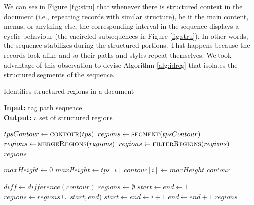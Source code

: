 We can see in Figure \ref{fig:stru} that whenever there is structured
content in the document (i.e., repeating records with similar structure), be it
the main content, menus, or anything else, the corresponding interval in the
sequence displays a cyclic behaviour (the encircled subsequences in Figure
\ref{fig:stru}).
In other words, the sequence stabilizes during the structured portions. That
happens because the records look alike and so their paths and styles repeat
themselves. We took advantage of this observation to devise Algorithm
\ref{alg:idreg} that isolates the structured segments of the sequence.

\begin{small}
\begin{algorithm}
\caption{\small{Identifies structured regions in a document}}
\label{alg:idreg}
\begin{flushleft}
\textbf{Input:} tag path sequence \\
\textbf{Output:} a set of structured regions
\end{flushleft} 

\begin{algorithmic}[1]

 
\State $tpsContour \leftarrow \Call{contour}{tps}$
\State $regions \leftarrow \Call{segment}{tpsContour}$
\State $regions \leftarrow \Call{mergeRegions}{regions}$
\State $regions \leftarrow \Call{filterRegions}{regions}$
\State \Return $regions$
\EndFunction


 \label{line:alg:idreg:contour:begin}
\State $maxHeight \leftarrow 0$ 
\label{line:alg:idreg:a}
\label{line:alg:idreg:b}
\State $maxHeight \leftarrow tps[i]$ 
\EndIf 
\State $contour[i] \leftarrow maxHeight$ 
\EndFor\label{line:alg:idreg:c} 
\State \Return $contour$ \label{line:alg:idreg:d} 
\EndFunction\label{line:alg:idreg:contour:end}


 
\State $diff \leftarrow difference(contour)$\label{line:alg:idreg:e}
\State $regions \leftarrow \emptyset$\label{line:alg:idreg:f}
\State $start \leftarrow end \leftarrow 1$
\State $regions \leftarrow regions \cup [start, end)$
\EndIf
\State $start \leftarrow end \leftarrow i + 1$
\Else
\State $end \leftarrow end + 1$
\EndIf
\EndFor\label{line:alg:idreg:g}
\State \Return $regions$\label{line:alg:idreg:h}
\EndFunction


\end{algorithmic}
\end{algorithm}
\end{small}
